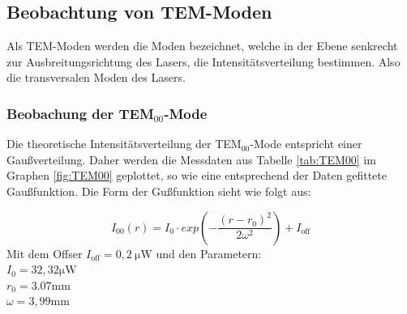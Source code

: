 \subsection{Beobachtung von TEM-Moden}
\label{sec:Beobachtung von TEM-Moden}
Als TEM-Moden werden die Moden bezeichnet, welche in der Ebene senkrecht zur Ausbreitungsrichtung des Lasers, 
die Intensitätsverteilung bestimmen. Also die transversalen Moden des Lasers.

\subsubsection{Beobachung der TEM$_{00}$-Mode}
\label{sec:Beobachung der 00-Mode}
Die theoretische Intensitätsverteilung der TEM$_{00}$-Mode entspricht einer Gaußverteilung. Daher werden die Messdaten aus Tabelle \ref{tab:TEM00} im Graphen \ref{fig:TEM00} geplottet,
so wie eine entsprechend der Daten gefittete Gaußfunktion. Die Form der Gußfunktion sieht wie folgt aus:

\begin{equation}
\label{equ:}
  I_{00}(r) = I_0 \cdot exp \left(- \frac{(r - r_0)^2}{2 \omega^2}\right) + I_{\text{off}}
\end{equation}
Mit dem Offser $I_{\text{off}} = 0,2 \: \si{\micro\watt}$ und den Parametern:\\
$I_0 = 32,32 \si{\micro\watt}$ \\
$r_0 = 3.07 \si{\milli\meter}$ \\
$\omega = 3,99 \si{\milli\meter}$


